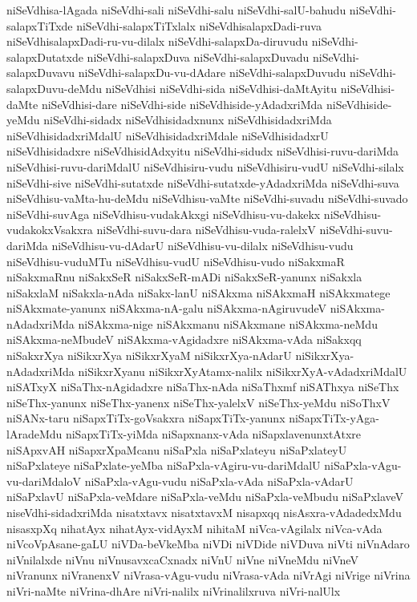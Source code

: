 {niSeVdhisa-lAgada
niSeVdhi-sali
niSeVdhi-salu
niSeVdhi-salU-bahudu
niSeVdhi-salapxTiTxde
niSeVdhi-salapxTiTxlalx
niSeVdhisalapxDadi-ruva
niSeVdhisalapxDadi-ru-vu-dilalx
niSeVdhi-salapxDa-diruvudu
niSeVdhi-salapxDutatxde
niSeVdhi-salapxDuva
niSeVdhi-salapxDuvadu
niSeVdhi-salapxDuvavu
niSeVdhi-salapxDu-vu-dAdare
niSeVdhi-salapxDuvudu
niSeVdhi-salapxDuvu-deMdu
niSeVdhisi
niSeVdhi-sida
niSeVdhisi-daMtAyitu
niSeVdhisi-daMte
niSeVdhisi-dare
niSeVdhi-side
niSeVdhiside-yAdadxriMda
niSeVdhiside-yeMdu
niSeVdhi-sidadx
niSeVdhisidadxnunx
niSeVdhisidadxriMda
niSeVdhisidadxriMdalU
niSeVdhisidadxriMdale
niSeVdhisidadxrU
niSeVdhisidadxre
niSeVdhisidAdxyitu
niSeVdhi-sidudx
niSeVdhisi-ruvu-dariMda
niSeVdhisi-ruvu-dariMdalU
niSeVdhisiru-vudu
niSeVdhisiru-vudU
niSeVdhi-silalx
niSeVdhi-sive
niSeVdhi-sutatxde
niSeVdhi-sutatxde-yAdadxriMda
niSeVdhi-suva
niSeVdhisu-vaMta-hu-deMdu
niSeVdhisu-vaMte
niSeVdhi-suvadu
niSeVdhi-suvado
niSeVdhi-suvAga
niSeVdhisu-vudakAkxgi
niSeVdhisu-vu-dakekx
niSeVdhisu-vudakokxVsakxra
niSeVdhi-suvu-dara
niSeVdhisu-vuda-ralelxV
niSeVdhi-suvu-dariMda
niSeVdhisu-vu-dAdarU
niSeVdhisu-vu-dilalx
niSeVdhisu-vudu
niSeVdhisu-vuduMTu
niSeVdhisu-vudU
niSeVdhisu-vudo
niSakxmaR
niSakxmaRnu
niSakxSeR
niSakxSeR-mADi
niSakxSeR-yanunx
niSakxla
niSakxlaM
niSakxla-nAda
niSakx-lanU
niSAkxma
niSAkxmaH
niSAkxmatege
niSAkxmate-yanunx
niSAkxma-nA-galu
niSAkxma-nAgiruvudeV
niSAkxma-nAdadxriMda
niSAkxma-nige
niSAkxmanu
niSAkxmane
niSAkxma-neMdu
niSAkxma-neMbudeV
niSAkxma-vAgidadxre
niSAkxma-vAda
niSakxqq
niSakxrXya
niSikxrXya
niSikxrXyaM
niSikxrXya-nAdarU
niSikxrXya-nAdadxriMda
niSikxrXyanu
niSikxrXyAtamx-nalilx
niSikxrXyA-vAdadxriMdalU
niSATxyX
niSaThx-nAgidadxre
niSaThx-nAda
niSaThxmf
niSAThxya
niSeThx
niSeThx-yanunx
niSeThx-yanenx
niSeThx-yalelxV
niSeThx-yeMdu
niSoThxV
niSANx-taru
niSapxTiTx-goVsakxra
niSapxTiTx-yanunx
niSapxTiTx-yAga-lAradeMdu
niSapxTiTx-yiMda
niSapxnanx-vAda
niSapxlavenunxtAtxre
niSApxvAH
niSapxrXpaMcanu
niSaPxla
niSaPxlateyu
niSaPxlateyU
niSaPxlateye
niSaPxlate-yeMba
niSaPxla-vAgiru-vu-dariMdalU
niSaPxla-vAgu-vu-dariMdaloV
niSaPxla-vAgu-vudu
niSaPxla-vAda
niSaPxla-vAdarU
niSaPxlavU
niSaPxla-veMdare
niSaPxla-veMdu
niSaPxla-veMbudu
niSaPxlaveV
niseVdhi-sidadxriMda
nisatxtavx
nisatxtavxM
nisapxqq
nisAsxra-vAdadedxMdu
nisasxpXq
nihatAyx
nihatAyx-vidAyxM
nihitaM
niVca-vAgilalx
niVca-vAda
niVcoVpAsane-gaLU
niVDa-beVkeMba
niVDi
niVDide
niVDuva
niVti
niVnAdaro
niVnilalxde
niVnu
niVnusavxcaCxnadx
niVnU
niVne
niVneMdu
niVneV
niVranunx
niVranenxV
niVrasa-vAgu-vudu
niVrasa-vAda
niVrAgi
niVrige
niVrina
niVri-naMte
niVrina-dhAre
niVri-nalilx
niVrinalilxruva
niVri-nalUlx
}
